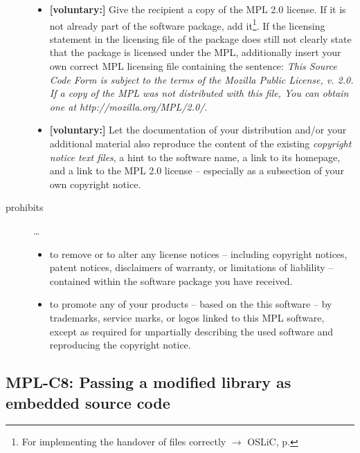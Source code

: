 \begin{description}
\begin{itemize}
  \item \textbf{[voluntary:]} Give the recipient a copy of the MPL 2.0 license.
  If it is not already part of the software package, add it\footnote{For
  implementing the handover of files correctly $\rightarrow$ OSLiC, p.
  \pageref{DistributingFilesHint}}. If the licensing statement in the licensing
  file of the package does still not clearly state that the package is licensed
  under the MPL, additionally insert your own correct MPL licensing file
  containing the sentence: \emph{This Source Code Form is subject to the terms
  of the Mozilla Public License, v. 2.0. If a copy of the MPL was not
  distributed with this file, You can obtain one at
  http://mozilla.org/MPL/2.0/}.
  
  \item \textbf{[voluntary:]} Let the documentation of your distribution and/or
  your additional material  also reproduce the content of the existing
  \emph{copyright notice text files}, a hint to the software name, a link to its
  homepage, and a link to the MPL 2.0 license -- especially as a subsection of
  your own copyright notice.
  
\end{itemize}

\item[prohibits] \ldots
\begin{itemize}
  \item to remove or to alter any license notices -- including copyright
  notices, patent notices, disclaimers of warranty, or limitations of liablility
  -- contained within the software package you have received.
  \item to promote any of your products -- based on the this software -- by
  trademarks, service marks, or logos linked to this MPL software, except as
  required for unpartially describing the used software and reproducing the
  copyright notice.
\end{itemize}

\end{description}

\subsection{MPL-C8: Passing a modified library as embedded source code}
\label{OSUC-10S-MPL}

